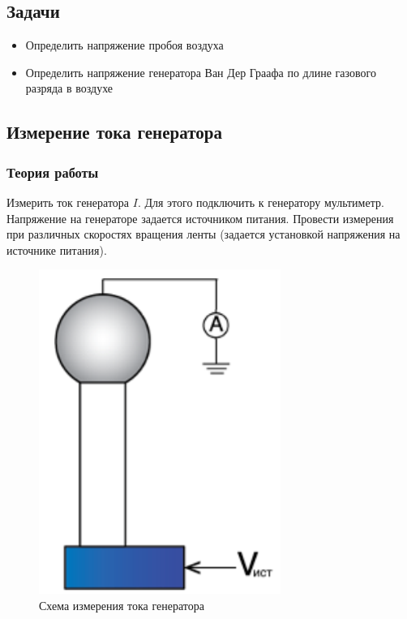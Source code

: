 \documentclass[a4paper,14pt]{extarticle}
\begin{document}
		\subsection{Задачи}
			\begin{itemize}
				\item Определить напряжение пробоя воздуха  
				\item Определить напряжение генератора Ван Дер Граафа по длине газового разряда в воздухе
			\end{itemize}
		\subsection{Измерение тока генератора}	
			\subsubsection{Теория работы}
				Измерить ток генератора $I$. Для этого подключить к генератору мультиметр. Напряжение на генераторе задается источником питания. Провести измерения при различных скоростях вращения ленты (задается установкой напряжения на источнике питания).
				\begin{figure}[h]
					\centering
					\includegraphics[width=.30\linewidth]{Схема4.png}
					\caption{Схема измерения тока генератора}
					\label{fig7}
				\end{figure}
				\newpage
\end{document}
